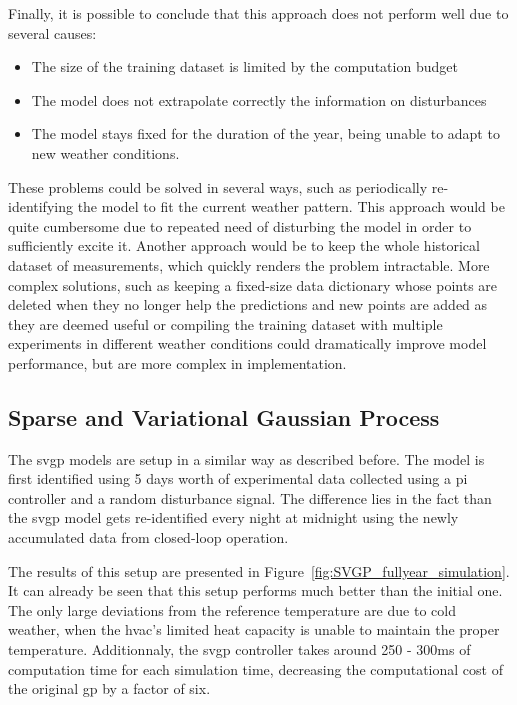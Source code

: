 Finally, it is possible to conclude that this approach does not perform well due
to several causes:

\begin{itemize}
    \item The size of the training dataset is limited by the computation budget
    \item The model does not extrapolate correctly the information on
        disturbances
    \item The model stays fixed for the duration of the year, being unable to
        adapt to new weather conditions.
\end{itemize}

These problems could be solved in several ways, such as periodically
re-identifying the model to fit the current weather pattern. This approach would
be quite cumbersome due to repeated need of disturbing the model in order to
sufficiently excite it. Another approach would be to keep the whole historical
dataset of measurements, which quickly renders the problem intractable. More
complex solutions, such as keeping a fixed-size data dictionary whose points are
deleted when they no longer help the predictions and new points are added as
they are deemed useful or compiling the training dataset with multiple
experiments in different weather conditions could dramatically improve model
performance, but are more complex in implementation.


\subsection{Sparse and Variational Gaussian Process}\label{sec:SVGP_results}

The \acrlong{svgp} models are setup in a similar way as described before. The
model is first identified using 5 days worth of experimental data collected
using a \acrshort{pi} controller and a random disturbance signal. The difference
lies in the fact than the \acrshort{svgp} model gets re-identified every night
at midnight using the newly accumulated data from closed-loop operation.

The results of this setup are presented in
Figure~\ref{fig:SVGP_fullyear_simulation}. It can already be seen that this
setup performs much better than the initial one. The only large deviations from
the reference temperature are due to cold weather, when the \acrshort{hvac}'s
limited heat capacity is unable to maintain the proper temperature.
Additionnaly, the \acrshort{svgp} controller takes around 250 - 300ms of
computation time for each simulation time, decreasing the computational cost of
the original \acrshort{gp} by a factor of six.




